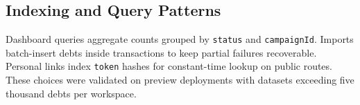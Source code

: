 \documentclass[12pt,a4paper]{report}
\begin{document}
\subsection{Indexing and Query Patterns}

Dashboard queries aggregate counts grouped by \texttt{status} and \texttt{campaignId}.
Imports batch-insert debts inside transactions to keep partial failures recoverable.
Personal links index \texttt{token} hashes for constant-time lookup on public routes.
These choices were validated on preview deployments with datasets exceeding five thousand
debts per workspace.
\end{document}
